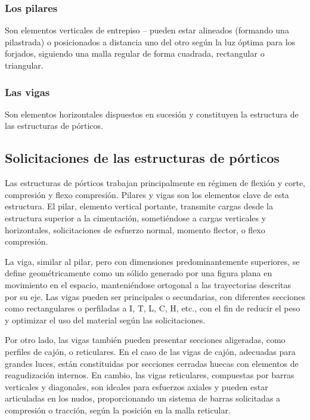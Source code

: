 \documentclass[14pt,letterpaper]{extarticle}
\begin{document}
	\subsubsection{Los pilares}
	
	Son elementos verticales de entrepiso – pueden estar alineados (formando una pilastrada) o posicionados a distancia uno del otro según la luz óptima para los forjados, siguiendo una malla regular de forma cuadrada, rectangular o triangular.
	
	\subsubsection{Las vigas}
	
	Son elementos horizontales dispuestos en sucesión y constituyen la estructura de las estructuras de pórticos.
	
	\subsection{Solicitaciones de las estructuras de pórticos}
	
	Las estructuras de pórticos trabajan principalmente en régimen de flexión y corte, compresión y flexo compresión. Pilares y vigas son los elementos clave de esta estructura. El pilar, elemento vertical portante, transmite cargas desde la estructura superior a la cimentación, sometiéndose a cargas verticales y horizontales, solicitaciones de esfuerzo normal, momento flector, o flexo compresión.
	
	La viga, similar al pilar, pero con dimensiones predominantemente superiores, se define geométricamente como un sólido generado por una figura plana en movimiento en el espacio, manteniéndose ortogonal a las trayectorias descritas por su eje. Las vigas pueden ser principales o secundarias, con diferentes secciones como rectangulares o perfiladas a I, T, L, C, H, etc., con el fin de reducir el peso y optimizar el uso del material según las solicitaciones.
	
	Por otro lado, las vigas también pueden presentar secciones aligeradas, como perfiles de cajón, o reticulares. En el caso de las vigas de cajón, adecuadas para grandes luces, están constituidas por secciones cerradas huecas con elementos de reagudización internos. En cambio, las vigas reticulares, compuestas por barras verticales y diagonales, son ideales para esfuerzos axiales y pueden estar articuladas en los nudos, proporcionando un sistema de barras solicitadas a compresión o tracción, según la posición en la malla reticular.
	
\end{document}
